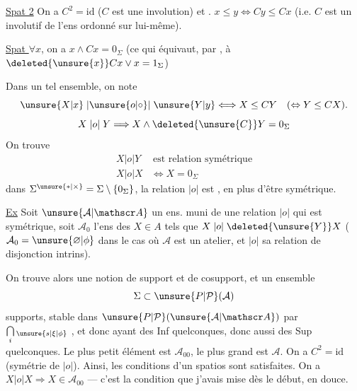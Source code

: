 \uline{Spat 2} On  a $C^2=\mathrm{id}$ ($C$ est une involution) et  . $x\leq y\Longleftrightarrow Cy\leq Cx$ (i.e. $C$ est un  involutif de l'ens ordonné sur lui-même).

\uline{Spat } $\forall x$, on a $x\wedge Cx=0_{\Sigma}$ (ce qui équivaut, par , à $\deleted{\unsure{x}}Cx\vee x=1_{\Sigma}$)

Dans un tel ensemble, on note
\[
\unsure{X|x}\mathrel{|\unsure{o|\circ}|}\unsure{Y|y}\Longleftrightarrow X\leq CY\quad(\Leftrightarrow Y\leq CX).
\]
\[
X\mathrel{|o|}Y\Longrightarrow X\wedge\deleted{\unsure{C}}Y=0_{\Sigma}
\]
On trouve
\[
\begin{aligned}
X\mathrel{|o|}Y &\ \text{est relation symétrique}\\
X\mathrel{|o|}X &\Longleftrightarrow X=0_{\Sigma}
\end{aligned}
\]
 dans $\Sigma^{\unsure{*|\times}}=\Sigma\setminus\{0_{\Sigma}\}$, la relation $\mathrel{|o|}$ est , en plus d'être symétrique.

\uline{Ex} Soit $\unsure{\mathcal A|\mathscr A}$ un ens. muni de une relation $\mathrel{|o|}$ qui est symétrique, soit $\mathcal A_0$ l'ens des $X\in A$ tels que $X\mathrel{|o|}\deleted{\unsure{Y}}X$     ($\mathcal A_0=\unsure{\varnothing|\phi}$ dans le cas où $\mathcal A$ est un atelier, et $\mathrel{|o|}$ sa  relation de disjonction intrins).


On trouve alors une notion de support et de cosupport, et un ensemble 
\[
\Sigma\subset\unsure{P|\mathcal P}(\mathcal A)
\]
 supports, stable dans $\unsure{P|\mathcal P}(\unsure{\mathcal A|\mathscr A})$ par $\bigcap\limits_i{}_{\unsure{s|\xi|\phi}}$ , et donc ayant des Inf quelconques, donc aussi des Sup quelconques.
Le plus petit élément est $\mathcal A_{00}$, le plus grand est $\mathcal A$. On a  $C^2=\mathrm{id}$ (symétrie de $\mathrel{|o|}$). Ainsi, les conditions  d'un spatios sont satisfaites. On a   $X\mathrel{|o|}X\Longrightarrow X\in\mathcal A_{00}$ --- c'est la condition que j'avais mise dès le début, en douce.

